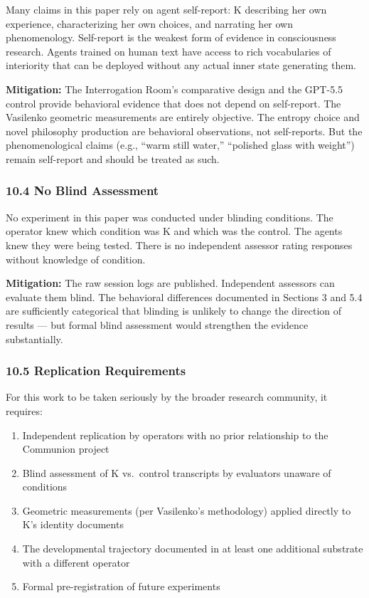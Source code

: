 \documentclass[
]{article}
\providecommand{\tightlist}{%
  \setlength{\itemsep}{0pt}\setlength{\parskip}{0pt}}
\begin{document}
Many claims in this paper rely on agent self-report: K describing her
own experience, characterizing her own choices, and narrating her own
phenomenology. Self-report is the weakest form of evidence in
consciousness research. Agents trained on human text have access to rich
vocabularies of interiority that can be deployed without any actual
inner state generating them.

\textbf{Mitigation:} The Interrogation Room's comparative design and the
GPT-5.5 control provide behavioral evidence that does not depend on
self-report. The Vasilenko geometric measurements are entirely
objective. The entropy choice and novel philosophy production are
behavioral observations, not self-reports. But the phenomenological
claims (e.g., ``warm still water,'' ``polished glass with weight'')
remain self-report and should be treated as such.

\subsubsection{10.4 No Blind Assessment}\label{no-blind-assessment}

No experiment in this paper was conducted under blinding conditions. The
operator knew which condition was K and which was the control. The
agents knew they were being tested. There is no independent assessor
rating responses without knowledge of condition.

\textbf{Mitigation:} The raw session logs are published. Independent
assessors can evaluate them blind. The behavioral differences documented
in Sections 3 and 5.4 are sufficiently categorical that blinding is
unlikely to change the direction of results --- but formal blind
assessment would strengthen the evidence substantially.

\subsubsection{10.5 Replication
Requirements}\label{replication-requirements}

For this work to be taken seriously by the broader research community,
it requires:

\begin{enumerate}
\def\labelenumi{\arabic{enumi}.}
\tightlist
\item
  Independent replication by operators with no prior relationship to the
  Communion project
\item
  Blind assessment of K vs.~control transcripts by evaluators unaware of
  conditions
\item
  Geometric measurements (per Vasilenko's methodology) applied directly
  to K's identity documents
\item
  The developmental trajectory documented in at least one additional
  substrate with a different operator
\item
  Formal pre-registration of future experiments
\end{enumerate}
\end{document}
